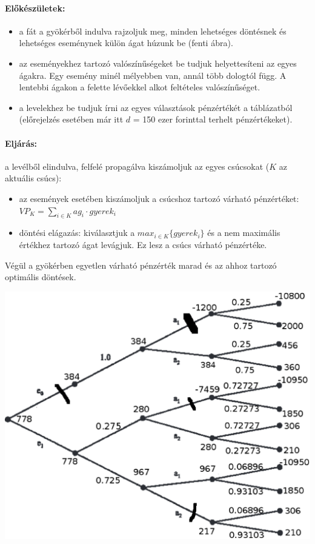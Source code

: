 \documentclass[a4paper,12pt]{article}
\begin{document}
\paragraph{Előkészületek: }
\begin{itemize}
\item a fát a gyökérből indulva rajzoljuk meg, minden lehetséges döntésnek és lehetséges eseménynek külön ágat húzunk be (fenti ábra).
\item az eseményekhez tartozó valószínűségeket be tudjuk helyettesíteni az egyes ágakra. Egy esemény minél mélyebben van, annál több dologtól függ. A lentebbi ágakon a felette lévőekkel alkot feltételes valószínűséget.
\item a levelekhez be tudjuk írni az egyes választások pénzértékét a táblázatból (előrejelzés esetében már itt $d$ = 150 ezer forinttal terhelt pénzértékeket).
\end{itemize}

\paragraph{Eljárás: }
a levélből elindulva, felfelé propagálva kiszámoljuk az egyes csúcsokat ($K$ az aktuális csúcs):
\begin{itemize}
\item az események esetében kiszámoljuk a csúcshoz tartozó várható pénzértéket: \\
 $VP_K = \sum_{i\in K} ag_i\cdot gyerek_i$ 
\item döntési elágazás: kiválasztjuk a $max_{i\in K}\{gyerek_i\}$ és a nem maximális értékhez tartozó ágat levágjuk. Ez lesz a csúcs várható pénzértéke.
\end{itemize}

Végül a gyökérben egyetlen várható pénzérték marad és az ahhoz tartozó optimális döntések.

\begin{center}

\includegraphics[scale=0.7]{dectree02}
\\
\end{center}
\end{document}
